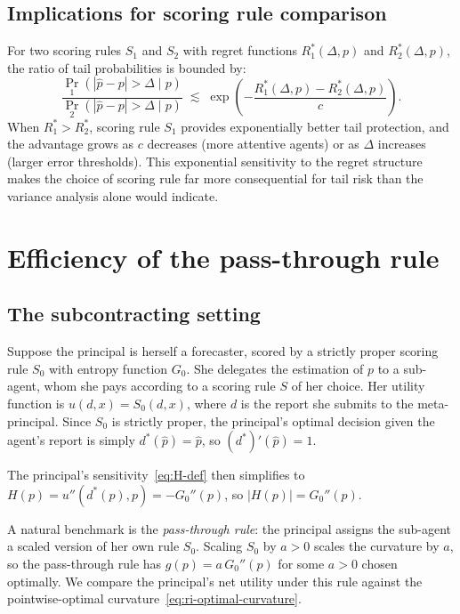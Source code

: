 \documentclass[11pt]{article}
\begin{document}
\subsection{Implications for scoring rule comparison}

For two scoring rules $S_1$ and $S_2$ with regret functions $R^*_1(\Delta,p)$ and $R^*_2(\Delta,p)$, the ratio of tail probabilities is bounded by:
\begin{equation}\label{eq:tail-ratio-ri}
\frac{\Pr_1(|\hat{p}-p|>\Delta \mid p)}{\Pr_2(|\hat{p}-p|>\Delta \mid p)} \;\lesssim\; \exp\!\left(-\frac{R^*_1(\Delta,p) - R^*_2(\Delta,p)}{c}\right).
\end{equation}
When $R^*_1 > R^*_2$, scoring rule $S_1$ provides exponentially better tail protection, and the advantage grows as $c$ decreases (more attentive agents) or as $\Delta$ increases (larger error thresholds). This exponential sensitivity to the regret structure makes the choice of scoring rule far more consequential for tail risk than the variance analysis alone would indicate.


\section{Efficiency of the pass-through rule}

\subsection{The subcontracting setting}

Suppose the principal is herself a forecaster, scored by a strictly proper scoring rule $S_0$ with entropy function $G_0$. She delegates the estimation of $p$ to a sub-agent, whom she pays according to a scoring rule $S$ of her choice. Her utility function is $u(d,x) = S_0(d,x)$, where $d$ is the report she submits to the meta-principal. Since $S_0$ is strictly proper, the principal's optimal decision given the agent's report is simply $d^*(\hat{p}) = \hat{p}$, so $(d^*)'(\hat{p}) = 1$.

The principal's sensitivity~\eqref{eq:H-def} then simplifies to $H(p) = u''(d^*(p),p) = -G_0''(p)$, so $|H(p)| = G_0''(p)$.

A natural benchmark is the \emph{pass-through rule}: the principal assigns the sub-agent a scaled version of her own rule $S_0$. Scaling $S_0$ by $a > 0$ scales the curvature by $a$, so the pass-through rule has $g(p) = a\,G_0''(p)$ for some $a > 0$ chosen optimally. We compare the principal's net utility under this rule against the pointwise-optimal curvature~\eqref{eq:ri-optimal-curvature}.
\end{document}
